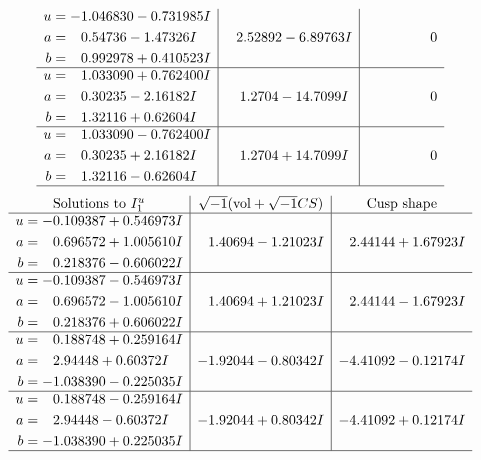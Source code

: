 \documentclass[1p]{elsarticle_modified}
\theoremstyle{definition}
\newcommand{\I}{\sqrt{-1}}
\begin{document}
$$\begin{array}{c|c|c}
\begin{aligned}
u &= -1.046830 - 0.731985 I \\
a &= \phantom{-}0.54736 - 1.47326 I \\
b &= \phantom{-}0.992978 + 0.410523 I\end{aligned}
 & \phantom{-}2.52892 - 6.89763 I & \phantom{-0.000000 } 0 \\ \hline\begin{aligned}
u &= \phantom{-}1.033090 + 0.762400 I \\
a &= \phantom{-}0.30235 - 2.16182 I \\
b &= \phantom{-}1.32116 + 0.62604 I\end{aligned}
 & \phantom{-}1.2704 - 14.7099 I & \phantom{-0.000000 } 0 \\ \hline\begin{aligned}
u &= \phantom{-}1.033090 - 0.762400 I \\
a &= \phantom{-}0.30235 + 2.16182 I \\
b &= \phantom{-}1.32116 - 0.62604 I\end{aligned}
 & \phantom{-}1.2704 + 14.7099 I & \phantom{-0.000000 } 0\\
 \hline 
 \end{array}$$\newpage$$\begin{array}{c|c|c}  
\text{Solutions to }I^u_{1}& \I (\text{vol} + \sqrt{-1}CS) & \text{Cusp shape}\\
 \hline 
\begin{aligned}
u &= -0.109387 + 0.546973 I \\
a &= \phantom{-}0.696572 + 1.005610 I \\
b &= \phantom{-}0.218376 - 0.606022 I\end{aligned}
 & \phantom{-}1.40694 - 1.21023 I & \phantom{-}2.44144 + 1.67923 I \\ \hline\begin{aligned}
u &= -0.109387 - 0.546973 I \\
a &= \phantom{-}0.696572 - 1.005610 I \\
b &= \phantom{-}0.218376 + 0.606022 I\end{aligned}
 & \phantom{-}1.40694 + 1.21023 I & \phantom{-}2.44144 - 1.67923 I \\ \hline\begin{aligned}
u &= \phantom{-}0.188748 + 0.259164 I \\
a &= \phantom{-}2.94448 + 0.60372 I \\
b &= -1.038390 - 0.225035 I\end{aligned}
 & -1.92044 - 0.80342 I & -4.41092 - 0.12174 I \\ \hline\begin{aligned}
u &= \phantom{-}0.188748 - 0.259164 I \\
a &= \phantom{-}2.94448 - 0.60372 I \\
b &= -1.038390 + 0.225035 I\end{aligned}
 & -1.92044 + 0.80342 I & -4.41092 + 0.12174 I\\
 \hline 
 \end{array}$$\newpage\newpage\renewcommand{\arraystretch}{1}
\end{document}
